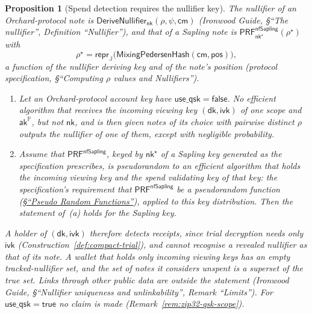 \documentclass[11pt,a4paper]{article}
\newtheorem{proposition}[theorem]{Proposition}
\theoremstyle{definition}
\newcommand{\PP}{\mathbb{P}}
\newcommand{\cmsym}{\mathsf{cm}}
\newcommand{\aksym}{\ensuremath{\mathsf{ak}}}
\newcommand{\nksym}{\ensuremath{\mathsf{nk}}}
\newcommand{\ivk}{\ensuremath{\mathsf{ivk}}}
\newcommand{\dk}{\ensuremath{\mathsf{dk}}}
\begin{document}
\begin{proposition}[Spend detection requires the nullifier key]%
\label{prop:scan-ivk-spends}
The nullifier of an Orchard-protocol note is
$\mathsf{DeriveNullifier}_{\nksym}(\rho, \psi, \cmsym)$ (\emph{Ironwood
Guide}, \S``The nullifier'', Definition ``Nullifier''), and that of a
Sapling note is $\mathsf{PRF}^{\mathsf{nfSapling}}_{\nksym^{\star}}
(\rho^{\star})$ with
\[
  \rho^{\star} = \mathsf{repr}_{\mathbb{J}}\bigl(
  \mathsf{MixingPedersenHash}(\cmsym, \mathsf{pos})\bigr),
\]
a function of the
nullifier deriving key and of the note's position (protocol specification,
\S``Computing $\rho$ values and Nullifiers'').
\begin{enumerate}[label=(\alph*)]
\item Let an Orchard-protocol account key have $\mathsf{use\_qsk} =
  \mathsf{false}$. No efficient algorithm that receives the incoming viewing
  key $(\dk, \ivk)$ of one scope and $\aksym^{\PP}$, but not $\nksym$, and
  is then given notes of its choice with pairwise distinct $\rho$ outputs
  the nullifier of one of them, except with negligible probability.
\item Assume that $\mathsf{PRF}^{\mathsf{nfSapling}}$, keyed by
  $\nksym^{\star}$ of a Sapling key generated as the specification
  prescribes, is pseudorandom to an efficient algorithm that holds the
  incoming viewing key and the spend validating key of that key: the
  specification's requirement that $\mathsf{PRF}^{\mathsf{nfSapling}}$ be a
  pseudorandom function
  (\href{https://zips.z.cash/protocol/protocol.pdf\#abstractprfs}%
  {\S``Pseudo Random Functions''}), applied to this key distribution.
  Then the statement of~(a) holds for the Sapling key.
\end{enumerate}
A holder of $(\dk, \ivk)$ therefore detects receipts, since trial
decryption needs only $\ivk$ (Construction~\ref{def:compact-trial}), and
cannot recognise a revealed nullifier as that of its note. A wallet that
holds only incoming viewing keys has an empty tracked-nullifier set, and the
set of notes it considers unspent is a superset of the true set. Links
through other public data are outside the statement (\emph{Ironwood Guide},
\S``Nullifier uniqueness and unlinkability'', Remark ``Limits''). For
$\mathsf{use\_qsk} = \mathsf{true}$ no claim is made
(Remark~\ref{rem:zip32-qsk-scope}).
\end{proposition}
\end{document}
